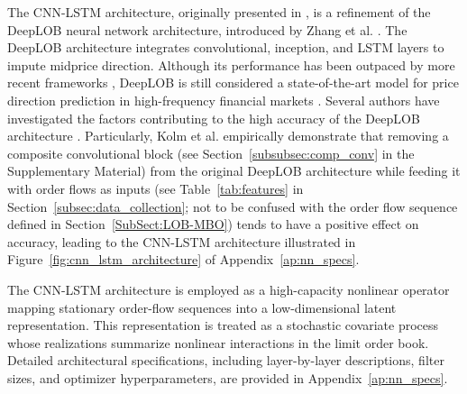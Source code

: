 \documentclass[10pt,a4paper,oneside]{article}
\providecommand{\DIFdelend}{} %
\DeclareRobustCommand{\DIFdelend}{\DIFOaddend \let\includegraphics\DIFOincludegraphics} %
\begin{document}
\DIFdelend The CNN-LSTM architecture, originally presented in \cite{kolm2023deep}, is a refinement of the DeepLOB neural network architecture, introduced by Zhang et al. \cite{Zhang_2019}. The DeepLOB architecture integrates convolutional, inception, and LSTM layers to impute midprice direction. Although its performance has been outpaced by more recent frameworks \cite{prata2024lob}, DeepLOB is still considered a state-of-the-art model for price direction prediction in high-frequency financial markets \cite{briola2024deep, kolm2023deep}. Several authors have investigated the factors contributing to the high accuracy of the DeepLOB architecture \cite{kolm2023deep, kolm2024improving, briola2024deep}. Particularly, Kolm et al. \cite{kolm2023deep} empirically demonstrate that removing a composite convolutional block (see Section~\ref{subsubsec:comp_conv} in the Supplementary Material) from the original DeepLOB architecture while feeding it with order flows as inputs (see Table~\ref{tab:features} in Section~\ref{subsec:data_collection}; not to be confused with the order flow sequence defined in Section~\ref{SubSect:LOB-MBO}) tends to have a positive effect on accuracy, leading to the CNN-LSTM architecture illustrated in Figure~\ref{fig:cnn_lstm_architecture} of Appendix~\ref{ap:nn_specs}.

The CNN-LSTM architecture is employed as a high-capacity nonlinear operator mapping stationary order-flow sequences into a low-dimensional latent representation. This representation is treated as a stochastic covariate process whose realizations summarize nonlinear interactions in the limit order book. Detailed architectural specifications, including layer-by-layer descriptions, filter sizes, and optimizer hyperparameters, are provided in Appendix~\ref{ap:nn_specs}.
\end{document}

